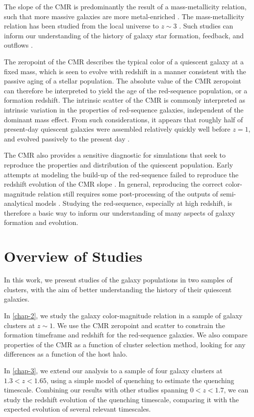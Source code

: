 The slope of the CMR is predominantly the result of a mass-metallicity relation, such that more massive galaxies are more metal-enriched \citep[e.g.,][]{Bower:1992mb,Kodama:1997rr,Vazdekis:2001aa,2003AJ....125.1866B}.
The mass-metallicity relation has been studied from the local universe to $z\sim3$ \citep{Tremonti:2004aa,Kewley:2008aa,Andrews:2013aa,Erb:2006aa,Maiolino:2008aa,DeGroot:2016aa}.
Such studies can inform our understanding of the history of galaxy star formation, feedback, and outflows \citep{Finlator:2008aa,Peeples:2011aa}.

The zeropoint of the CMR describes the typical color of a quiescent galaxy at a fixed mass, which is seen to evolve with redshift in a manner consistent with the passive aging of a stellar population.
The absolute value of the CMR zeropoint can therefore be interpreted to yield the age of the red-sequence population, or a formation redshift.
The intrinsic scatter of the CMR is commonly interpreted as intrinsic variation in the properties of red-sequence galaxies, independent of the dominant mass effect.
From such considerations, it appears that roughly half of present-day quiescent galaxies were assembled relatively quickly well before $z=1$, and evolved passively to the present day \citep[e.g.,][]{Bower:1998cr,Peebles:2002aa,2003ApJ...596L.143B,Mei:2009wt,Foltz:2015aa}.

The CMR also provides a sensitive diagnostic for simulations that seek to reproduce the properties and distribution of the quiescent population.
Early attempts at modeling the build-up of the red-sequence failed to reproduce the redshift evolution of the CMR slope \citep{Romeo:2008aa,Menci:2008aa}.
In general, reproducing the correct color-magnitude relation still requires some post-processing of the outputs of semi-analytical models \citep[see e.g.][]{Ascaso:2015aa}.
Studying the red-sequence, especially at high redshift, is therefore a basic way to inform our understanding of many aspects of galaxy formation and evolution.

\section{Overview of Studies}

In this work, we present studies of the galaxy populations in two samples of clusters, with the aim of better understanding the history of their quiescent galaxies.

In \ref{chap-2}, we study the galaxy color-magnitude relation in a sample of galaxy clusters at $z\sim1$.
We use the CMR zeropoint and scatter to constrain the formation timeframe and redshift for the red-sequence galaxies.
We also compare properties of the CMR as a function of cluster selection method, looking for any differences as a function of the host halo.

In \ref{chap-3}, we extend our analysis to a sample of four galaxy clusters at $1.3 < z < 1.65$, using a simple model of quenching to estimate the quenching timescale.
Combining our results with other studies spanning $0 < z < 1.7$, we can study the redshift evolution of the quenching timescale, comparing it with the expected evolution of several relevant timescales.
